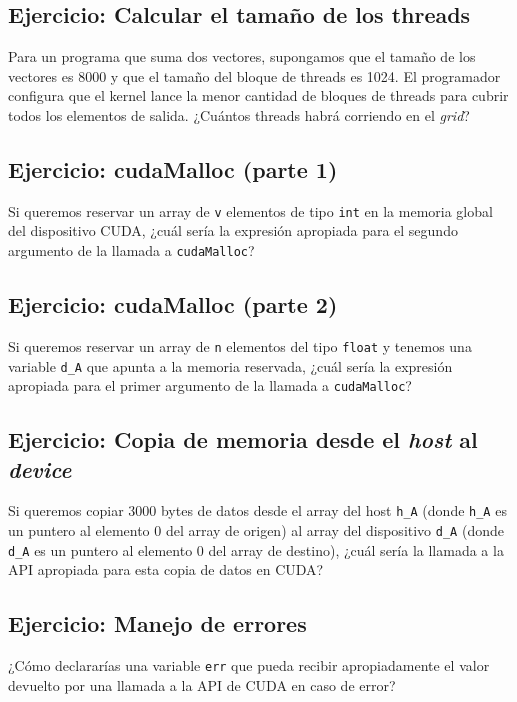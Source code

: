 \subsection{Ejercicio: Calcular el tamaño de los threads}

Para un programa que suma dos vectores, supongamos que el tamaño de los vectores es 8000 y que el tamaño del bloque de
threads es 1024. El programador configura que el kernel lance la menor cantidad de bloques de threads para cubrir todos
los elementos de salida. ¿Cuántos threads habrá corriendo en el \textit{grid}?

\subsection{Ejercicio: cudaMalloc (parte 1)}

Si queremos reservar un array de \texttt{v} elementos de tipo \texttt{int} en la memoria global del dispositivo CUDA,
¿cuál sería la expresión apropiada para el segundo argumento de la llamada a \texttt{cudaMalloc}?

\subsection{Ejercicio: cudaMalloc (parte 2)}

Si queremos reservar un array de \texttt{n} elementos del tipo \texttt{float} y tenemos una variable \texttt{d\_A} que
apunta a la memoria reservada, ¿cuál sería la expresión apropiada para el primer argumento de la llamada a
\texttt{cudaMalloc}?

\subsection{Ejercicio: Copia de memoria desde el \textit{host} al \textit{device}}

Si queremos copiar 3000 bytes de datos desde el array del host \texttt{h\_A} (donde \texttt{h\_A} es un puntero al
elemento 0 del array de origen) al array del dispositivo \texttt{d\_A} (donde \texttt{d\_A} es un puntero al elemento 0
del array de destino), ¿cuál sería la llamada a la API apropiada para esta copia de datos en CUDA?

\subsection{Ejercicio: Manejo de errores}

¿Cómo declararías una variable \texttt{err} que pueda recibir apropiadamente el valor devuelto por una llamada a la API
de CUDA en caso de error?

